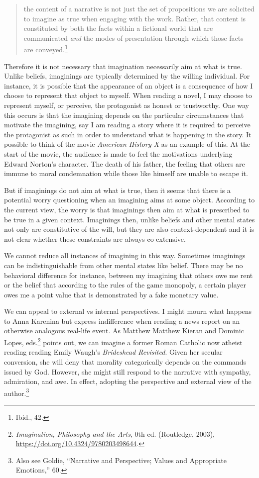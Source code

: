 \documentclass[
  12pt,
]{book}
\theoremstyle{definition}
\theoremstyle{definition}
\theoremstyle{definition}
\theoremstyle{definition}
\theoremstyle{remark}
\begin{document}
\begin{quote}
the content of a narrative is not just the set of propositions we are solicited to imagine as true when engaging with the work. Rather, that content is constituted by both the facts within a fictional world that are communicated \emph{and} the modes of presentation through which those facts are conveyed.\footnote{Ibid., 42.}
\end{quote}

Therefore it is not necessary that imagination necessarily aim at what is true. Unlike beliefs, imaginings are typically determined by the willing individual. For instance, it is possible that the appearance of an object is a consequence of how I choose to represent that object to myself. When reading a novel, I may choose to represent myself, or perceive, the protagonist as honest or trustworthy. One way this occurs is that the imagining depends on the particular circumstances that motivate the imagining, say I am reading a story where it is required to perceive the protagonist as such in order to understand what is happening in the story. It possible to think of the movie \emph{American History X} as an example of this. At the start of the movie, the audience is made to feel the motivations underlying Edward Norton's character. The death of his father, the feeling that others are immune to moral condemnation while those like himself are unable to escape it.

But if imaginings do not aim at what is true, then it seems that there is a potential worry questioning when an imagining aims at some object. According to the current view, the worry is that imaginings then aim at what is prescribed to be true in a given context. Imaginings then, unlike beliefs and other mental states not only are constitutive of the will, but they are also context-dependent and it is not clear whether these constraints are always co-extensive.

We cannot reduce all instances of imagining in this way. Sometimes imaginings can be indistinguishable from other mental states like belief. There may be no behavioral difference for instance, between my imagining that others owe me rent or the belief that according to the rules of the game monopoly, a certain player owes me a point value that is demonstrated by a fake monetary value.

We can appeal to external vs internal perspectives. I might mourn what happens to Anna Karenina but express indifference when reading a news report on an otherwise analogous real-life event. As Matthew Matthew Kieran and Dominic Lopes, eds.\footnote{\emph{Imagination, {Philosophy} and the {Arts}}, 0th ed. (Routledge, 2003), \url{https://doi.org/10.4324/9780203498644}.} points out, we can imagine a former Roman Catholic now atheist reading reading Emily Waugh's \emph{Brideshead Revisited}. Given her secular conversion, she will deny that morality categorically depends on the commands issued by God. However, she might still respond to the narrative with sympathy, admiration, and awe. In effect, adopting the perspective and external view of the author.\footnote{Also see Goldie, {``Narrative and {Perspective}; {Values} and {Appropriate Emotions},''} 60.}
\end{document}
